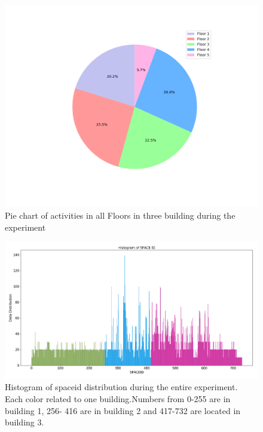 

\begin{figure}
    \centering
    \includegraphics[width = 12 cm]{image/Chapters/Chapter6/floors.png}
    \caption{Pie chart of activities in all Floors in three building during the experiment }
    \label{Pfloor}
\end{figure}





\begin{figure}
    \centering
    \includegraphics[width = 16 cm]{image/Chapters/Chapter6/uniqspaceid.png}
    \caption{Histogram of spaceid distribution during the entire experiment. Each color related to one building.Numbers from 0-255 are in building 1, 256- 416 are in building 2 and 417-732 are located in building 3.}
    \label{spaceiduniq }
\end{figure}






